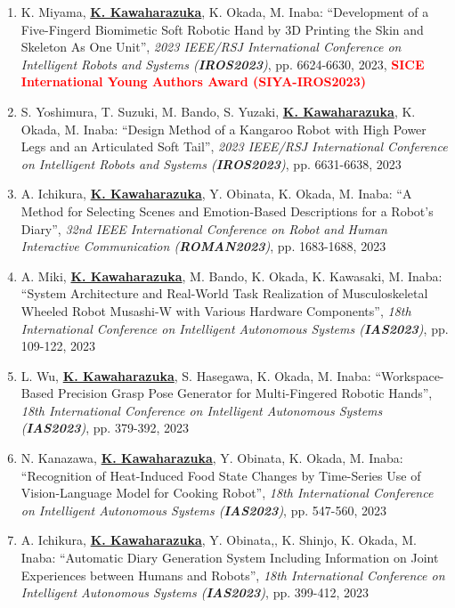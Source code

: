 \documentclass[letterpaper,11pt]{article}
\begin{document}
\begin{enumerate}
\item K. Miyama, \underline{\textbf{K. Kawaharazuka}}, K. Okada, M. Inaba: ``Development of a Five-Fingerd Biomimetic Soft Robotic Hand by 3D Printing the Skin and Skeleton As One Unit'', \textit{2023 IEEE/RSJ International Conference on Intelligent Robots and Systems (\textit{\textbf{IROS2023}})}, pp. 6624-6630, 2023, \textbf{\textcolor{red}{SICE International Young Authors Award (SIYA-IROS2023)}}
\item S. Yoshimura, T. Suzuki, M. Bando, S. Yuzaki, \underline{\textbf{K. Kawaharazuka}}, K. Okada, M. Inaba: ``Design Method of a Kangaroo Robot with High Power Legs and an Articulated Soft Tail'', \textit{2023 IEEE/RSJ International Conference on Intelligent Robots and Systems (\textit{\textbf{IROS2023}})}, pp. 6631-6638, 2023
\item A. Ichikura, \underline{\textbf{K. Kawaharazuka}}, Y. Obinata, K. Okada, M. Inaba: ``A Method for Selecting Scenes and Emotion-Based Descriptions for a Robot's Diary'', \textit{32nd IEEE International Conference on Robot and Human Interactive Communication (\textit{\textbf{ROMAN2023}})}, pp. 1683-1688, 2023
\item A. Miki, \underline{\textbf{K. Kawaharazuka}}, M. Bando, K. Okada, K. Kawasaki, M. Inaba: ``System Architecture and Real-World Task Realization of Musculoskeletal Wheeled Robot Musashi-W with Various Hardware Components'', \textit{18th International Conference on Intelligent Autonomous Systems (\textit{\textbf{IAS2023}})}, pp. 109-122, 2023
\item L. Wu, \underline{\textbf{K. Kawaharazuka}}, S. Hasegawa, K. Okada, M. Inaba: ``Workspace-Based Precision Grasp Pose Generator for Multi-Fingered Robotic Hands'', \textit{18th International Conference on Intelligent Autonomous Systems (\textit{\textbf{IAS2023}})}, pp. 379-392, 2023
\item N. Kanazawa, \underline{\textbf{K. Kawaharazuka}}, Y. Obinata, K. Okada, M. Inaba: ``Recognition of Heat-Induced Food State Changes by Time-Series Use of Vision-Language Model for Cooking Robot'', \textit{18th International Conference on Intelligent Autonomous Systems (\textit{\textbf{IAS2023}})}, pp. 547-560, 2023
\item A. Ichikura, \underline{\textbf{K. Kawaharazuka}}, Y. Obinata,, K. Shinjo, K. Okada, M. Inaba: ``Automatic Diary Generation System Including Information on Joint Experiences between Humans and Robots'', \textit{18th International Conference on Intelligent Autonomous Systems (\textit{\textbf{IAS2023}})}, pp. 399-412, 2023

\end{enumerate}
\end{document}

